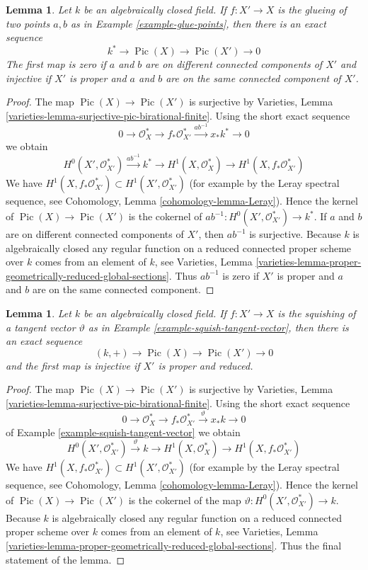 \documentclass{stacks-project}
\theoremstyle{plain}
\newtheorem{lemma}[subsection]{Lemma}
\theoremstyle{definition}
\theoremstyle{remark}
\numberwithin{equation}{subsection}
\def\Pic{\mathop{\mathrm{Pic}}\nolimits}
\begin{document}
\begin{lemma}
\label{lemma-glue-points}
Let $k$ be an algebraically closed field. If $f : X' \to X$ is the
glueing of two points $a, b$ as in Example \ref{example-glue-points}, then
there is an exact sequence
$$
k^* \to \Pic(X) \to \Pic(X') \to 0
$$
The first map is zero if $a$ and $b$ are on different
connected components of $X'$ and injective
if $X'$ is proper and $a$ and $b$ are on the same connected component of $X'$.
\end{lemma}

\begin{proof}
The map $\Pic(X) \to \Pic(X')$ is surjective
by Varieties, Lemma \ref{varieties-lemma-surjective-pic-birational-finite}.
Using the short exact sequence
$$
0 \to \mathcal{O}_X^* \to f_*\mathcal{O}_{X'}^*
\xrightarrow{ab^{-1}} x_*k^* \to 0
$$
we obtain
$$
H^0(X', \mathcal{O}_{X'}^*) \xrightarrow{ab^{-1}} k^* \to
H^1(X, \mathcal{O}_X^*) \to H^1(X, f_*\mathcal{O}_{X'}^*)
$$
We have $H^1(X, f_*\mathcal{O}_{X'}^*) \subset H^1(X', \mathcal{O}_{X'}^*)$
(for example by the Leray spectral sequence, see
Cohomology, Lemma \ref{cohomology-lemma-Leray}).
Hence the kernel of $\Pic(X) \to \Pic(X')$ is the
cokernel of $ab^{-1} : H^0(X', \mathcal{O}_{X'}^*) \to k^*$.
If $a$ and $b$ are on different connected components of $X'$,
then $ab^{-1}$ is surjective.
Because $k$ is algebraically closed any regular function on a
reduced connected proper scheme over $k$ comes from an element of $k$, see
Varieties, Lemma
\ref{varieties-lemma-proper-geometrically-reduced-global-sections}.
Thus $ab^{-1}$ is zero if $X'$ is proper and $a$ and $b$ are on
the same connected component.
\end{proof}

\begin{lemma}
\label{lemma-squish-tangent-vector}
Let $k$ be an algebraically closed field. If $f : X' \to X$ is the
squishing of a tangent vector $\vartheta$ as in
Example \ref{example-squish-tangent-vector}, then
there is an exact sequence
$$
(k, +) \to \Pic(X) \to \Pic(X') \to 0
$$
and the first map is injective if $X'$ is proper and reduced.
\end{lemma}

\begin{proof}
The map $\Pic(X) \to \Pic(X')$ is surjective
by Varieties, Lemma \ref{varieties-lemma-surjective-pic-birational-finite}.
Using the short exact sequence
$$
0 \to \mathcal{O}_X^* \to f_*\mathcal{O}_{X'}^*
\xrightarrow{\vartheta} x_*k \to 0
$$
of Example \ref{example-squish-tangent-vector} we obtain
$$
H^0(X', \mathcal{O}_{X'}^*) \xrightarrow{\vartheta} k \to
H^1(X, \mathcal{O}_X^*) \to H^1(X, f_*\mathcal{O}_{X'}^*)
$$
We have $H^1(X, f_*\mathcal{O}_{X'}^*) \subset H^1(X', \mathcal{O}_{X'}^*)$
(for example by the Leray spectral sequence, see
Cohomology, Lemma \ref{cohomology-lemma-Leray}).
Hence the kernel of $\Pic(X) \to \Pic(X')$ is the
cokernel of the map $\vartheta : H^0(X', \mathcal{O}_{X'}^*) \to k$.
Because $k$ is algebraically closed any regular function on a
reduced connected proper scheme over $k$ comes from an element of $k$, see
Varieties, Lemma
\ref{varieties-lemma-proper-geometrically-reduced-global-sections}.
Thus the final statement of the lemma.
\end{proof}
\end{document}
